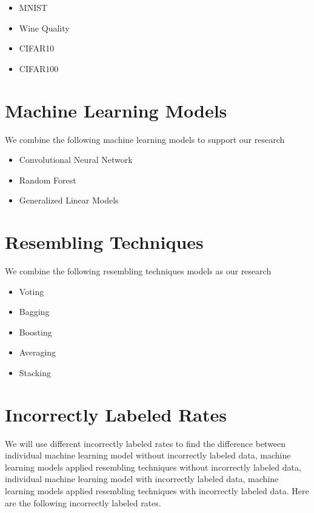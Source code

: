 \documentclass{article}
\begin{document}
\begin{itemize}
    \item MNIST
    \item Wine Quality
    \item CIFAR10
    \item CIFAR100
\end{itemize}

\section{Machine Learning Models}

We combine the following machine learning models to support our research


\begin{itemize}
    \item Convolutional Neural Network
    \item Random Forest
    \item Generalized Linear Models 
\end{itemize}


\section{Resembling Techniques}

We combine the following resembling techniques models as our research


\begin{itemize}
    \item Voting
    \item Bagging
    \item Boosting
    \item Averaging
    \item Stacking
\end{itemize}

\section{Incorrectly Labeled Rates}

We will use different incorrectly labeled rates to find the difference between individual machine learning model without incorrectly labeled data, machine learning models applied resembling techniques without incorrectly labeled data, individual machine learning model with incorrectly labeled data, machine learning models applied resembling techniques with incorrectly labeled data. Here are the following incorrectly labeled rates. 
\end{document}
